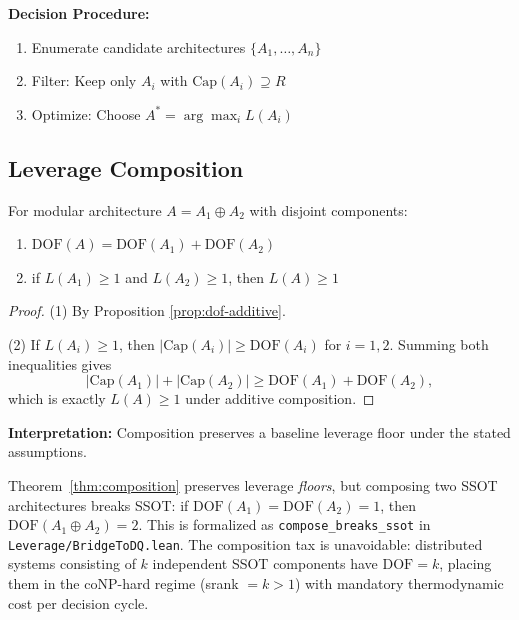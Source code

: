 \textbf{Decision Procedure:}
\begin{enumerate}
\item Enumerate candidate architectures $\{A_1, \ldots, A_n\}$
\item Filter: Keep only $A_i$ with $\text{Cap}(A_i) \supseteq R$
\item Optimize: Choose $A^* = \arg\max_i L(A_i)$
\end{enumerate}

\subsection{Leverage Composition}

\begin{theorem}\label{thm:composition}
For modular architecture $A = A_1 \oplus A_2$ with disjoint components:
\begin{enumerate}
\item $\text{DOF}(A) = \text{DOF}(A_1) + \text{DOF}(A_2)$
\item if $L(A_1)\ge 1$ and $L(A_2)\ge 1$, then $L(A)\ge 1$
\end{enumerate}
\end{theorem}

\begin{proof}
(1) By Proposition \ref{prop:dof-additive}.

(2) If $L(A_i)\ge 1$, then $|\text{Cap}(A_i)|\ge \text{DOF}(A_i)$ for $i=1,2$. Summing both inequalities gives
\[
|\text{Cap}(A_1)|+|\text{Cap}(A_2)|\ge \text{DOF}(A_1)+\text{DOF}(A_2),
\]
which is exactly $L(A)\ge 1$ under additive composition.
\end{proof}

\textbf{Interpretation:} Composition preserves a baseline leverage floor under the stated assumptions.

\begin{remark}\label{rem:composition-breaks-ssot}
Theorem~\ref{thm:composition} preserves leverage \emph{floors}, but composing two SSOT architectures breaks SSOT: if $\mathrm{DOF}(A_1) = \mathrm{DOF}(A_2) = 1$, then $\mathrm{DOF}(A_1 \oplus A_2) = 2$. This is formalized as \texttt{compose\_breaks\_ssot} in \texttt{Leverage/BridgeToDQ.lean}. The composition tax is unavoidable: distributed systems consisting of $k$ independent SSOT components have $\mathrm{DOF} = k$, placing them in the coNP-hard regime (srank $= k > 1$) with mandatory thermodynamic cost per decision cycle.
\end{remark}


